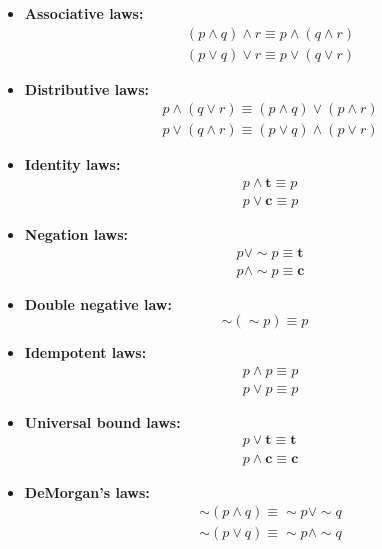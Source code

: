 \documentclass{report}
\begin{document}
\begin{itemize}
\begin{itemize}
    \item \textbf{Associative laws:}
    \begin{align*}
        & (p \land q) \land r \equiv p \land (q \land r) \\
        & (p \lor q) \lor r \equiv p \lor (q \lor r)
    \end{align*}
    
    \item \textbf{Distributive laws:}
    \begin{align*}
        & p \land (q \lor r) \equiv (p \land q) \lor (p \land r) \\
        & p \lor (q \land r) \equiv (p \lor q) \land (p \lor r)
    \end{align*}
    
    \item \textbf{Identity laws:}
    \begin{align*}
        & p \land \mathbf{t} \equiv p \\
        & p \lor \mathbf{c} \equiv p
    \end{align*}
    
    \item \textbf{Negation laws:}
    \begin{align*}
        & p \lor \sim p \equiv \mathbf{t} \\
        & p \land \sim p \equiv \mathbf{c}
    \end{align*}
    
    \item \textbf{Double negative law:}
    \[
    \sim(\sim p) \equiv p
    \]
    
    \item \textbf{Idempotent laws:}
    \begin{align*}
        & p \land p \equiv p \\
        & p \lor p \equiv p
    \end{align*}
    
    \item \textbf{Universal bound laws:}
    \begin{align*}
        & p \lor \mathbf{t} \equiv \mathbf{t} \\
        & p \land \mathbf{c} \equiv \mathbf{c}
    \end{align*}
    
    \item \textbf{DeMorgan's laws:}
    \begin{align*}
        & \sim(p \land q) \equiv \sim p \lor \sim q \\
        & \sim(p \lor q) \equiv \sim p \land \sim q
    \end{align*}
    

\end{itemize}
\end{itemize}
\end{document}

